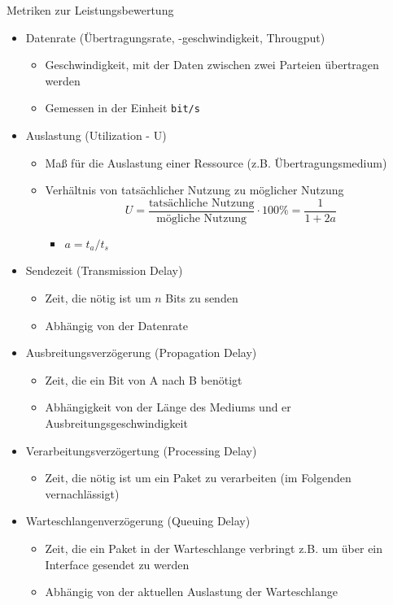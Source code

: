       Metriken zur Leistungsbewertung
      \begin{itemize}
        \item Datenrate (Übertragungsrate, -geschwindigkeit, Througput)
          \begin{itemize}
            \item Geschwindigkeit, mit der Daten zwischen zwei Parteien übertragen werden
            \item Gemessen in der Einheit \verb!bit/s!
          \end{itemize}
        \item Auslastung (Utilization - U)
          \begin{itemize}
            \item Maß für die Auslastung einer Ressource (z.B. Übertragungsmedium)
            \item Verhältnis von tatsächlicher Nutzung zu möglicher Nutzung
              $$U=\frac{\text{tatsächliche Nutzung}}{\text{mögliche Nutzung}}\cdot100\%=\frac{1}{1+2a}$$
              \begin{itemize}
                \item $a=t_a/t_s$
              \end{itemize}
          \end{itemize}
        \item Sendezeit (Transmission Delay)
          \begin{itemize}
            \item Zeit, die nötig ist um $n$ Bits zu senden
            \item Abhängig von der Datenrate
          \end{itemize}
        \item Ausbreitungsverzögerung (Propagation Delay)
          \begin{itemize}
            \item Zeit, die ein Bit von A nach B benötigt
            \item Abhängigkeit von der Länge des Mediums und er Ausbreitungsgeschwindigkeit
          \end{itemize}
        \item Verarbeitungsverzögertung (Processing Delay)
          \begin{itemize}
            \item Zeit, die nötig ist um ein Paket zu verarbeiten (im Folgenden vernachlässigt)
          \end{itemize}
        \item Warteschlangenverzögerung (Queuing Delay)
          \begin{itemize}
            \item Zeit, die ein Paket in der Warteschlange verbringt z.B. um über ein Interface
              gesendet zu werden
            \item Abhängig von der aktuellen Auslastung der Warteschlange
          \end{itemize}
      \end{itemize}
